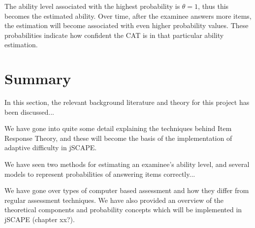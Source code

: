 The ability level associated with the highest probability is $\theta=1$, thus this becomes the estimated ability. Over time, after the examinee answers more items, the estimation will become associated with even higher probability values. These probabilities indicate how confident the CAT is in that particular ability estimation.

\section{Summary}
In this section, the relevant background literature and theory for this project has been discussed...\newline

We have gone into quite some detail explaining the techniques behind Item Response Theory, and these will become the basis of the implementation of adaptive difficulty in jSCAPE.\newline

We have seen two methods for estimating an examinee's ability level, and several models to represent probabilities of answering items correctly...\newline

We have gone over types of computer based assessment and how they differ from regular assessment techniques. We have also provided an overview of the theoretical components and probability concepts which will be implemented in jSCAPE (chapter xx?).
